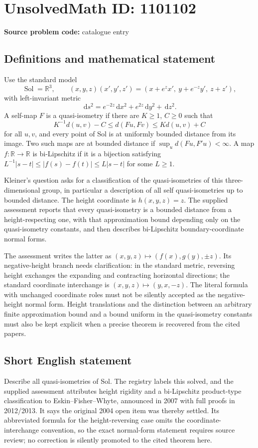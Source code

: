 \documentclass[11pt]{article}
\newcommand{\R}{\mathbb{R}}
\newcommand{\dd}{\,\mathrm{d}}
\begin{document}
\section*{UnsolvedMath ID: 1101102}
\textbf{Source problem code:} catalogue entry
\subsection{Definitions and mathematical statement}
Use the standard model
\[
 \operatorname{Sol}=\R^3,\qquad
 (x,y,z)(x',y',z')=(x+e^zx',\ y+e^{-z}y',\ z+z'),
\]
with left-invariant metric
\[
 \dd s^2=e^{-2z}\dd x^2+e^{2z}\dd y^2+\dd z^2.
\]
A self-map $F$ is a quasi-isometry if there are $K\geq1$, $C\geq0$ such that
\[
 K^{-1}d(u,v)-C\leq d(Fu,Fv)\leq Kd(u,v)+C
\]
for all $u,v$, and every point of Sol is at uniformly bounded distance from its image. Two such maps are at bounded distance if $\sup_u d(Fu,F'u)<\infty$. A map $f:\R\to\R$ is bi-Lipschitz if it is a bijection satisfying $L^{-1}|s-t|\leq|f(s)-f(t)|\leq L|s-t|$ for some $L\geq1$.

Kleiner's question asks for a classification of the quasi-isometries of this three-dimensional group, in particular a description of all self quasi-isometries up to bounded distance. The height coordinate is $h(x,y,z)=z$. The supplied assessment reports that every quasi-isometry is a bounded distance from a height-respecting one, with that approximation bound depending only on the quasi-isometry constants, and then describes bi-Lipschitz boundary-coordinate normal forms.

The assessment writes the latter as $(x,y,z)\mapsto(f(x),g(y),\pm z)$. Its negative-height branch needs clarification: in the standard metric, reversing height exchanges the expanding and contracting horizontal directions; the standard coordinate interchange is $(x,y,z)\mapsto(y,x,-z)$. The literal formula with unchanged coordinate roles must not be silently accepted as the negative-height normal form. Height translations and the distinction between an arbitrary finite approximation bound and a bound uniform in the quasi-isometry constants must also be kept explicit when a precise theorem is recovered from the cited papers.
\subsection{Short English statement}
Describe all quasi-isometries of Sol. The registry labels this solved, and the supplied assessment attributes height rigidity and a bi-Lipschitz product-type classification to Eskin--Fisher--Whyte, announced in 2007 with full proofs in 2012/2013. It says the original 2004 open item was thereby settled. Its abbreviated formula for the height-reversing case omits the coordinate-interchange convention, so the exact normal-form statement requires source review; no correction is silently promoted to the cited theorem here.
\end{document}
